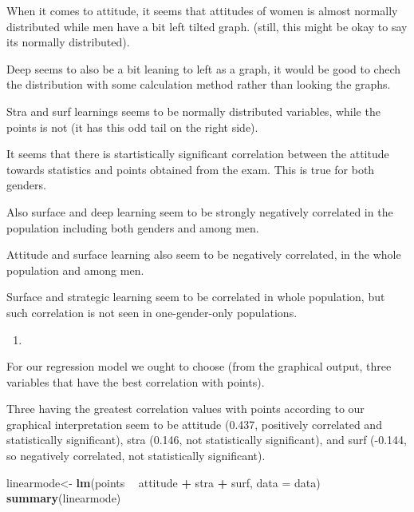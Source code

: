 \documentclass[
]{article}
\newenvironment{Shaded}{\begin{snugshade}}{\end{snugshade}}
\newcommand{\DataTypeTok}[1]{\textcolor[rgb]{0.13,0.29,0.53}{#1}}
\newcommand{\KeywordTok}[1]{\textcolor[rgb]{0.13,0.29,0.53}{\textbf{#1}}}
\newcommand{\NormalTok}[1]{#1}
\newcommand{\OperatorTok}[1]{\textcolor[rgb]{0.81,0.36,0.00}{\textbf{#1}}}
\newcommand{\StringTok}[1]{\textcolor[rgb]{0.31,0.60,0.02}{#1}}
\begin{document}
When it comes to attitude, it seems that attitudes of women is almost
normally distributed while men have a bit left tilted graph. (still,
this might be okay to say its normally distributed).

Deep seems to also be a bit leaning to left as a graph, it would be good
to chech the distribution with some calculation method rather than
looking the graphs.

Stra and surf learnings seems to be normally distributed variables,
while the points is not (it has this odd tail on the right side).

It seems that there is startistically significant correlation between
the attitude towards statistics and points obtained from the exam. This
is true for both genders.

Also surface and deep learning seem to be strongly negatively correlated
in the population including both genders and among men.

Attitude and surface learning also seem to be negatively correlated, in
the whole population and among men.

Surface and strategic learning seem to be correlated in whole
population, but such correlation is not seen in one-gender-only
populations.

\begin{enumerate}
\def\labelenumi{\arabic{enumi}.}
\setcounter{enumi}{2}
\item
\end{enumerate}

For our regression model we ought to choose (from the graphical output,
three variables that have the best correlation with points).

Three having the greatest correlation values with points according to
our graphical interpretation seem to be attitude (0.437, positively
correlated and statistically significant), stra (0.146, not
statistically significant), and surf (-0.144, so negatively correlated,
not statistically significant).

\begin{Shaded}
\begin{Highlighting}[]
\NormalTok{  linearmode<-}\StringTok{ }\KeywordTok{lm}\NormalTok{(points }\OperatorTok{~}\StringTok{ }\NormalTok{attitude }\OperatorTok{+}\StringTok{ }\NormalTok{stra }\OperatorTok{+}\StringTok{ }\NormalTok{surf, }\DataTypeTok{data =}\NormalTok{ data)}
\KeywordTok{summary}\NormalTok{(linearmode)}
\end{Highlighting}
\end{Shaded}
\end{document}
